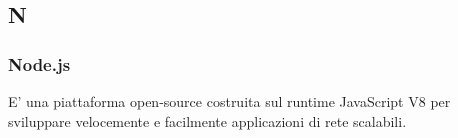 \subsection*{\textbf{\hfill \Huge{N} \hfill}} 
\subsubsection*{Node.js}
E' una piattaforma open-source costruita sul runtime JavaScript V8 per sviluppare velocemente e facilmente applicazioni di rete scalabili.
